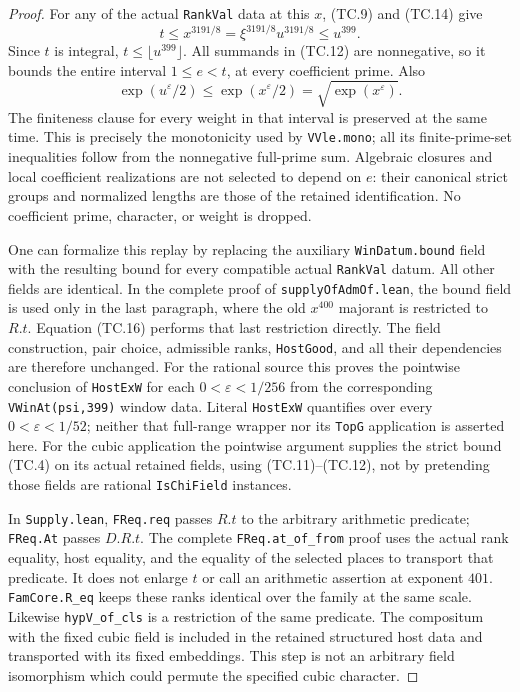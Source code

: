 \begin{proof}
For any of the actual \texttt{RankVal} data at this $x$,
(TC.9) and (TC.14) give
\[
 t\leq x^{3191/8}=\xi^{3191/8}u^{3191/8}
                  \leq u^{399}.
 \tag{TC.16}
\]
Since $t$ is integral, $t\leq\lfloor u^{399}\rfloor$.
All summands in (TC.12) are nonnegative, so it bounds the
entire interval $1\leq e<t$, at every coefficient prime.
Also
\[
                 \exp(u^\varepsilon/2)
                       \leq\exp(x^\varepsilon/2)
                       =\sqrt{\exp(x^\varepsilon)}.
 \tag{TC.17}
\]
The finiteness clause for every weight in that interval is
preserved at the same time.  This is precisely the monotonicity
used by \texttt{VVle.mono}; all its finite-prime-set inequalities
follow from the nonnegative full-prime sum.  Algebraic closures
and local coefficient realizations are not selected to depend
on $e$: their canonical strict groups and normalized lengths
are those of the retained identification.  No coefficient prime,
character, or weight is dropped.

One can formalize this replay by replacing the auxiliary
\texttt{WinDatum.bound} field with the resulting bound for
every compatible actual \texttt{RankVal} datum.  All other
fields are identical.  In the complete proof of
\texttt{supplyOfAdmOf.lean}, the bound field is used only in
the last paragraph, where the old $x^{400}$ majorant is
restricted to $R.t$.  Equation (TC.16) performs that last
restriction directly.  The field construction, pair choice,
admissible ranks, \texttt{HostGood}, and all their dependencies
are therefore unchanged.  For the rational source this proves
the pointwise conclusion of \texttt{HostExW} for each
$0<\varepsilon<1/256$ from the corresponding
\texttt{VWinAt(psi,399)} window data.  Literal \texttt{HostExW}
quantifies over every $0<\varepsilon<1/52$; neither that
full-range wrapper nor its \texttt{TopG} application is asserted
here.  For the cubic application the pointwise argument supplies
the strict bound (TC.4) on its actual retained fields, using
(TC.11)--(TC.12), not by pretending those fields are rational
\texttt{IsChiField} instances.

In \texttt{Supply.lean}, \texttt{FReq.req} passes $R.t$ to
the arbitrary arithmetic predicate; \texttt{FReq.At} passes
$D.R.t$.  The complete \texttt{FReq.at\_of\_from} proof
uses the actual rank equality, host equality, and the equality
of the selected places to transport that predicate.  It does
not enlarge $t$ or call an arithmetic assertion at exponent
$401$.  \texttt{FamCore.R\_eq} keeps these ranks identical
over the family at the same scale.  Likewise
\texttt{hypV\_of\_cls} is a restriction of the same predicate.
The compositum with the fixed cubic field is included in the
retained structured host data and transported with its fixed
embeddings.  This step is not an arbitrary field isomorphism
which could permute the specified cubic character.


\end{proof}
